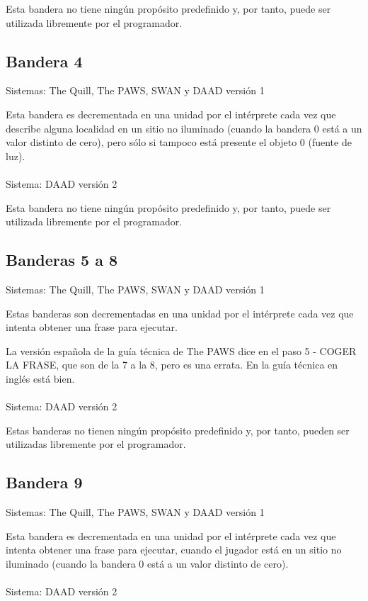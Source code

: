 \documentclass[11pt, a5paper]{article}
\newcommand{\quill}{\textsf{The Quill}\xspace}
\newcommand{\paw}{\textsf{The PAWS}\xspace}
\newcommand{\swan}{\textsf{SWAN}\xspace}
\newcommand{\daad}{\textsf{DAAD}\xspace}
\newcommand{\sistema}[1]{\noindent Sistema: #1 \nopagebreak}
\newcommand{\sistemas}[1]{\noindent Sistemas: #1 \nopagebreak}
\begin{document}
Esta bandera no tiene ningún propósito predefinido y, por tanto, puede ser utilizada libremente por el programador.

\subsection{Bandera 4}

\sistemas{\quill, \paw, \swan y \daad versión 1}

Esta bandera es decrementada en una unidad por el intérprete cada vez que describe alguna localidad en un sitio no iluminado (cuando la bandera 0 está a un valor distinto de cero), pero sólo si tampoco está presente el objeto 0 (fuente de luz).
\\\ \\
\sistema{\daad versión 2}

Esta bandera no tiene ningún propósito predefinido y, por tanto, puede ser utilizada libremente por el programador.

\subsection{Banderas 5 a 8}

\sistemas{\quill, \paw, \swan y \daad versión 1}

Estas banderas son decrementadas en una unidad por el intérprete cada vez que intenta obtener una frase para ejecutar.

La versión española de la guía técnica de \paw dice en el paso 5 - COGER LA FRASE, que son de la 7 a la 8, pero es una errata. En la guía técnica en inglés \cite{PawsPC} está bien.
\\\ \\
\sistema{\daad versión 2}

Estas banderas no tienen ningún propósito predefinido y, por tanto, pueden ser utilizadas libremente por el programador.

\subsection{Bandera 9}

\sistemas{\quill, \paw, \swan y \daad versión 1}

Esta bandera es decrementada en una unidad por el intérprete cada vez que intenta obtener una frase para ejecutar, cuando el jugador está en un sitio no iluminado (cuando la bandera 0 está a un valor distinto de cero).
\\\ \\
\sistema{\daad versión 2}
\end{document}
